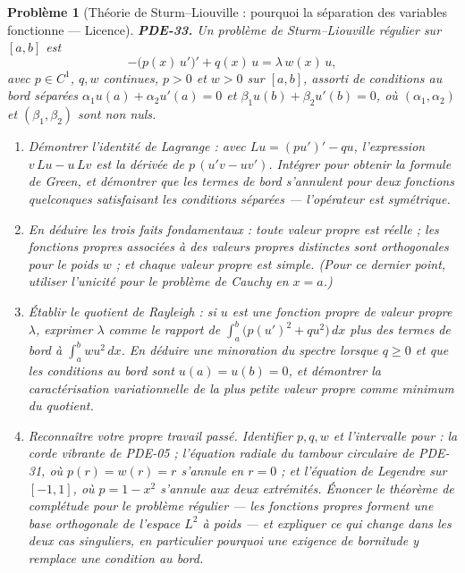\documentclass[11pt]{article}
\newtheorem{problem}{Problème}
\begin{document}
\begin{problem}[{Théorie de Sturm--Liouville : pourquoi la séparation des variables fonctionne --- Licence}]
\textbf{PDE-33.} Un \textit{problème de Sturm--Liouville régulier} sur $[a,b]$ est
\[ -\bigl(p(x)\,u'\bigr)' + q(x)\,u = \lambda\,w(x)\,u, \]
avec $p \in C^1$, $q, w$ continues, $p > 0$ et $w > 0$ sur $[a,b]$, assorti de
conditions au bord séparées $\alpha_1 u(a) + \alpha_2 u'(a) = 0$ et
$\beta_1 u(b) + \beta_2 u'(b) = 0$, où $(\alpha_1,\alpha_2)$ et $(\beta_1,\beta_2)$
sont non nuls.
\begin{enumerate}
\item[(a)] Démontrer l'identité de Lagrange : avec $Lu = (p u')' - q u$, l'expression $v\,Lu - u\,Lv$
est la dérivée de $p\,(u'v - u v')$. Intégrer pour obtenir la formule de Green, et démontrer que
les termes de bord s'annulent pour deux fonctions quelconques satisfaisant les conditions séparées
--- l'opérateur est symétrique.
\item[(b)] En déduire les trois faits fondamentaux : toute valeur propre est réelle ; les fonctions
propres associées à des valeurs propres distinctes sont orthogonales pour le poids $w$ ; et
chaque valeur propre est simple. (Pour ce dernier point, utiliser l'unicité pour le problème de
Cauchy en $x = a$.)
\item[(c)] Établir le quotient de Rayleigh : si $u$ est une fonction propre de valeur propre
$\lambda$, exprimer $\lambda$ comme le rapport de $\int_a^b \bigl(p (u')^2 + q u^2\bigr)\,dx$
plus des termes de bord à $\int_a^b w u^2\,dx$. En déduire une minoration du spectre lorsque
$q \ge 0$ et que les conditions au bord sont $u(a) = u(b) = 0$, et démontrer la
caractérisation variationnelle de la plus petite valeur propre comme minimum du quotient.
\item[(d)] Reconnaître votre propre travail passé. Identifier $p, q, w$ et l'intervalle pour : la corde
vibrante de PDE-05 ; l'équation radiale du tambour circulaire de PDE-31, où
$p(r) = w(r) = r$ s'annule en $r = 0$ ; et l'équation de Legendre sur $[-1,1]$, où
$p = 1-x^2$ s'annule aux deux extrémités. Énoncer le théorème de complétude pour le problème
régulier --- les fonctions propres forment une base orthogonale de l'espace $L^2$ à poids --- et
expliquer ce qui change dans les deux cas \textit{singuliers}, en particulier pourquoi une exigence
de bornitude y remplace une condition au bord.
\end{enumerate}

\end{problem}
\end{document}
